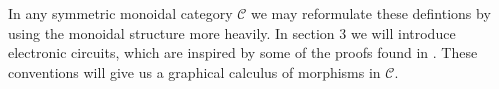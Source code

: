 \documentclass[../thesis.tex]{subfiles}
\begin{document}
            In any symmetric monoidal category $\mathcal{C}$ we may reformulate these defintions by using the monoidal structure more heavily. In section 3 we will introduce electronic circuits, which are inspired by some of the proofs found in \cite{Loday12}. These conventions will give us a graphical calculus of morphisms in $\mathcal{C}$.
                    




                    



\end{document}
